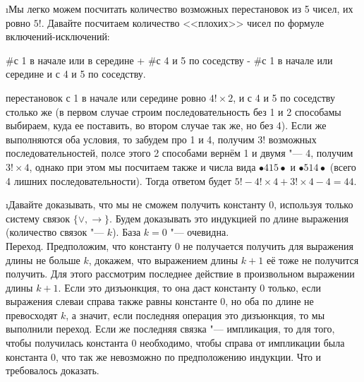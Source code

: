 \i Мы легко можем посчитать количество возможных перестановок из 5 чисел, их ровно $5!$. Давайте посчитаем количество <<плохих>> чисел по формуле включений-исключений:
\begin{center}
    \#с 1 в начале или в середине + \#с 4 и 5 по соседству - \#с 1 в начале или середине и с 4 и 5 по соседству.
\end{center}
перестановок с 1 в начале или середине ровно $4! \times 2$, и с 4 и 5 по соседству столько же (в первом случае строим последовательность без 1 и 2 способамы выбираем, куда ее поставить, во втором случае так же, но без 4). Если же выполняются оба условия, то забудем про 1 и 4, получим $3!$ возможных последовательностей, полсе этого 2 способами вернём 1 и двумя "--- 4, получим $3! \times 4$, однако при этом мы посчитаем также и числа вида $\bullet415\bullet$ и $\bullet514\bullet$ (всего 4 лишних последовательности). Тогда ответом будет $5! - 4! \times 4 + 3! \times 4 - 4 = 44$.

\i Давайте доказывать, что мы не сможем получить константу 0, используя только систему связок $\{\vee, \rightarrow \}$. Будем доказывать это индукцией по длине выражения (количество связок "--- $k$). База $k=0$ "--- очевидна.\\
Переход. Предположим, что константу 0 не получается получить для выражения длины не больше $k$, докажем, что выражением длины $k+1$ её тоже не получится получить. Для этого рассмотрим последнее действие в произвольном выражении длины $k+1$. Если это дизъюнкция, то она даст константу 0 только, если выражения слеваи справа также равны константе 0, но оба по длине не превосходят $k$, а значит, если последняя операция это дизъюнкция, то мы выполнили переход. Если же последняя связка "--- импликация, то для того, чтобы получилась константа 0 необходимо, чтобы справа от импликации была константа 0, что так же невозможно по предположению индукции. Что и требовалось доказать.

